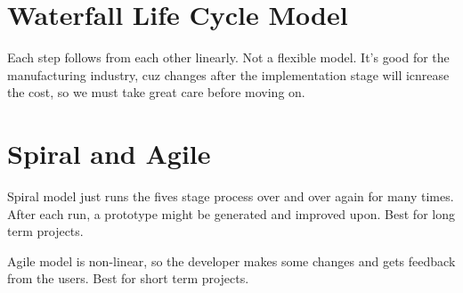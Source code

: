 \documentclass{article}
\theoremstyle{mytheoremstyle}
\theoremstyle{mytheoremstyle}
\theoremstyle{myproblemstyle}
\begin{document}
    \section{Waterfall Life Cycle Model}
    Each step follows from each other linearly. Not a flexible model. It's good for the manufacturing industry, cuz changes after the implementation stage will icnrease the cost, so we must take great care before moving on.

    \section{Spiral and Agile}
    Spiral model just runs the fives stage process over and over again for many times. After each run, a prototype might be generated and improved upon. Best for long term projects.

    Agile model is non-linear, so the developer makes some changes and gets feedback from the users. Best for short term projects.
    
\end{document}
